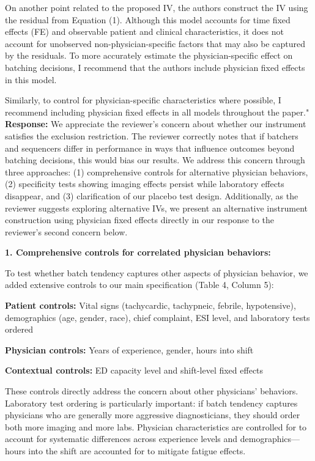 \documentclass[11pt]{article}
\newenvironment{quote2}
{ \bigskip
\noindent
         \small\em
         \baselineskip=14pt
}
\newcommand{\1}{\hbox{\rm 1\kern-.35em 1}}
\begin{document}
{\begin{quote2}
On another point related to the proposed IV, the authors construct the IV using the residual from Equation (1). Although this model accounts for time fixed effects (FE) and observable patient and clinical characteristics, it does not account for unobserved non-physician-specific factors that may also be captured by the residuals. To more accurately estimate the physician-specific effect on batching decisions, I recommend that the authors include physician fixed effects in this model.

Similarly, to control for physician-specific characteristics where possible, I recommend including physician fixed effects in all models throughout the paper."
\end{quote2}

\noindent\textbf{Response:} \color{blue}We appreciate the reviewer's concern about whether our instrument satisfies the exclusion restriction. The reviewer correctly notes that if batchers and sequencers differ in performance in ways that influence outcomes beyond batching decisions, this would bias our results. We address this concern through three approaches: (1) comprehensive controls for alternative physician behaviors, (2) specificity tests showing imaging effects persist while laboratory effects disappear, and (3) clarification of our placebo test design. Additionally, as the reviewer suggests exploring alternative IVs, we present an alternative instrument construction using physician fixed effects directly in our response to the reviewer's second concern below.

\textbf{1. Comprehensive controls for correlated physician behaviors:}

To test whether batch tendency captures other aspects of physician behavior, we added extensive controls to our main specification (Table 4, Column 5):

\textbf{Patient controls:} Vital signs (tachycardic, tachypneic, febrile, hypotensive), demographics (age, gender, race), chief complaint, ESI level, and laboratory tests ordered

\textbf{Physician controls:} Years of experience, gender, hours into shift

\textbf{Contextual controls:} ED capacity level and shift-level fixed effects

These controls directly address the concern about other physicians' behaviors. Laboratory test ordering is particularly important: if batch tendency captures physicians who are generally more aggressive diagnosticians, they should order both more imaging and more labs. Physician characteristics are controlled for to account for systematic differences across experience levels and demographics—hours into the shift are accounted for to mitigate fatigue effects.

}
\end{document}

